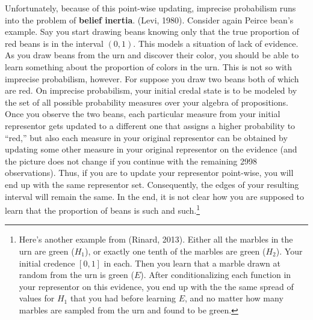 \documentclass[
  10pt,
  dvipsnames,enabledeprecatedfontcommands]{scrartcl}
\begin{document}
Unfortunately, because of this point-wise updating, imprecise
probabilism runs into the problem of \textbf{belief inertia}. (Levi,
1980). Consider again Peirce bean's example. Say you start drawing beans
knowing only that the true proportion of red beans is in the interval
\((0,1)\).  This models a situation of
lack of evidence. As you draw beans from the urn and discover their
color, you should be able to learn something about the proportion of
colors in the urn. This is not so with imprecise probabilism, however.
For suppose you draw two beans both of which are red. On imprecise
probabilism, your initial credal state is to be modeled by the set of
all possible probability measures over your algebra of propositions.
Once you observe the two beans, each particular measure from your
initial representor gets updated to a different one that assigns a
higher probability to ``red,'' but also each measure in your original
representor can be obtained by updating some other measure in your
original representor on the evidence (and the picture does not change if
you continue with the remaining 2998 observations).
 Thus,
if you are to update your representor point-wise, you will end up with
the same representor set. Consequently, the edges of your resulting
interval will remain the same. In the end, it is not clear how you are
supposed to learn that the proportion of beans is such and
such.\footnote{ Here's another example from (Rinard, 2013). Either all
  the marbles in the urn are green (\(H_1\)), or exactly one tenth of
  the marbles are green (\(H_2\)). Your initial credence \([0,1]\) in
  each. Then you learn that a marble drawn at random from the urn is
  green (\(E\)). After conditionalizing each function in your
  representor on this evidence, you end up with the the same spread of
  values for \(H_1\) that you had before learning \(E\), and no matter
  how many marbles are sampled from the urn and found to be green.}
\end{document}
